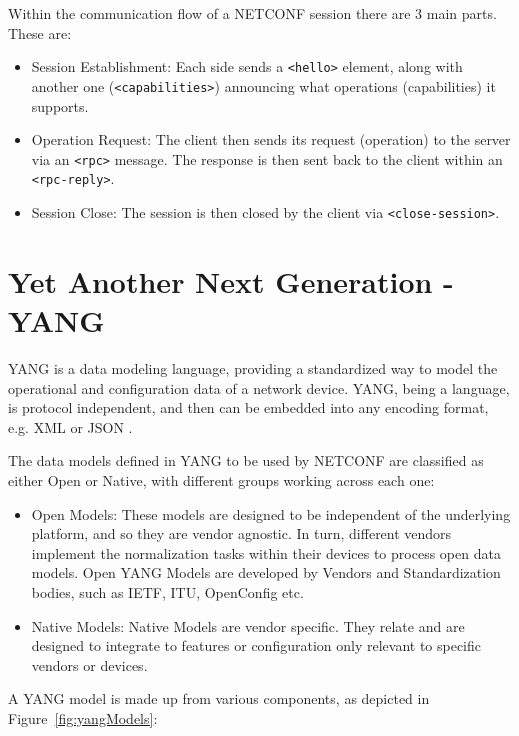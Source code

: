 Within the communication flow of a NETCONF session there are 3 main parts. These are:
\begin{itemize}
    \item Session Establishment: Each side sends a \texttt{<hello>} element, along with another one (\texttt{<capabilities>}) announcing what operations (capabilities) it supports.
    
    \item Operation Request: The client then sends its request (operation) to the server via an \texttt{<rpc>} message. The response is then sent back to the client within an \texttt{<rpc-reply>}.
    
    \item Session Close: The session is then closed by the client via \texttt{<close-session>}.
\end{itemize}

\section{Yet Another Next Generation - YANG}

\gls{YANG} is a data modeling language, providing a standardized way to model the operational and configuration data of a network device. YANG, being a language, is protocol independent, and then can be embedded into any encoding format, e.g. XML or JSON \cite{NETCONFYANG}.


The data models defined in YANG to be used by NETCONF are classified as either Open or Native, with different groups working across each one:

\begin{itemize}
    \item Open Models: These models are designed to be independent of the underlying platform, and so they are vendor agnostic. In turn, different vendors implement the normalization tasks within their devices to process open data models. Open YANG Models are developed by Vendors and Standardization bodies, such as IETF, ITU, OpenConfig etc.
    
    \item Native Models: Native Models are vendor specific. They relate and are designed to integrate to features or configuration only relevant to specific vendors or devices.
\end{itemize}

A YANG model is made up from various components, as depicted in Figure~\ref{fig:yangModels}:

